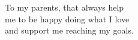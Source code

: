 \null
\vspace{2cm}
\begin{flushright}
 To my parents, that always help\\
me to be happy doing what I love\\
and support me reaching my goals.
\end{flushright}
\vfill
\cleardoublepage %
\null
\vspace{2cm}
\thispagestyle{empty}